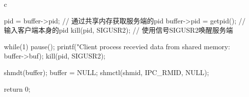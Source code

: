 \begin{code-block}{c}
{        pid = buffer->pid; // 通过共享内存获取服务端的pid
        buffer->pid = getpid(); // 输入客户端本身的pid
        kill(pid, SIGUSR2); // 使用信号SIGUSR2唤醒服务端

        while(1)
        {
                pause();
                printf("Client process recevied data from shared memory: %
                        buffer->buf);
                kill(pid, SIGUSR2);
        }

        shmdt(buffer);
        buffer = NULL;
        shmctl(shmid, IPC_RMID, NULL);

        return 0;
}
\end{code-block}
